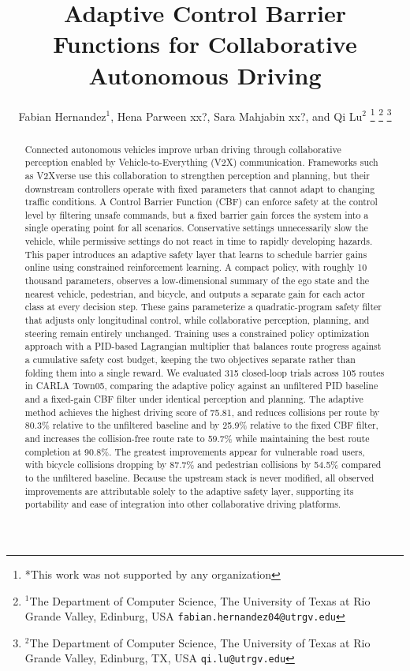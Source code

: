 \documentclass[letterpaper, 10 pt, conference]{ieeeconf}  %
\title{\LARGE \bf
Adaptive Control Barrier Functions for Collaborative Autonomous Driving
}
\author{
Fabian Hernandez$^1$, Hena Parween xx?, Sara Mahjabin xx?, and Qi Lu$^2$ %
\thanks{*This work was not supported by any organization}%
\thanks{$^1$The Department of Computer Science,
        The University of Texas at Rio Grande Valley, Edinburg, USA
        {\tt\small fabian.hernandez04@utrgv.edu}}
\thanks{$^2$The Department of Computer Science, The University of Texas at Rio Grande Valley, Edinburg, TX, USA
        {\tt\small qi.lu@utrgv.edu}}
}
\begin{document}
\maketitle
\thispagestyle{empty}
\pagestyle{empty}


\begin{abstract}
Connected autonomous vehicles improve urban driving through collaborative perception enabled by Vehicle-to-Everything (V2X) communication. Frameworks such as V2Xverse use this collaboration to strengthen perception and planning, but their downstream controllers operate with fixed parameters that cannot adapt to changing traffic conditions. A Control Barrier Function (CBF) can enforce safety at the control level by filtering unsafe commands, but a fixed barrier gain forces the system into a single operating point for all scenarios. Conservative settings unnecessarily slow the vehicle, while permissive settings do not react in time to rapidly developing hazards. This paper introduces an adaptive safety layer that learns to schedule barrier gains online using constrained reinforcement learning. A compact policy, with roughly 10 thousand parameters, observes a low-dimensional summary of the ego state and the nearest vehicle, pedestrian, and bicycle, and outputs a separate gain for each actor class at every decision step. These gains parameterize a quadratic-program safety filter that adjusts only longitudinal control, while collaborative perception, planning, and steering remain entirely unchanged. Training uses a constrained policy optimization approach with a PID-based Lagrangian multiplier that balances route progress against a cumulative safety cost budget, keeping the two objectives separate rather than folding them into a single reward. We evaluated 315 closed-loop trials across 105 routes in CARLA Town05, comparing the adaptive policy against an unfiltered PID baseline and a fixed-gain CBF filter under identical perception and planning. The adaptive method achieves the highest driving score of 75.81, and reduces collisions per route by 80.3\% relative to the unfiltered baseline and by 25.9\% relative to the fixed CBF filter, and increases the collision-free route rate to 59.7\% while maintaining the best route completion at 90.8\%. The greatest improvements appear for vulnerable road users, with bicycle collisions dropping by 87.7\% and pedestrian collisions by 54.5\% compared to the unfiltered baseline. Because the upstream stack is never modified, all observed improvements are attributable solely to the adaptive safety layer, supporting its portability and ease of integration into other collaborative driving platforms.

\end{abstract}
\end{document}

